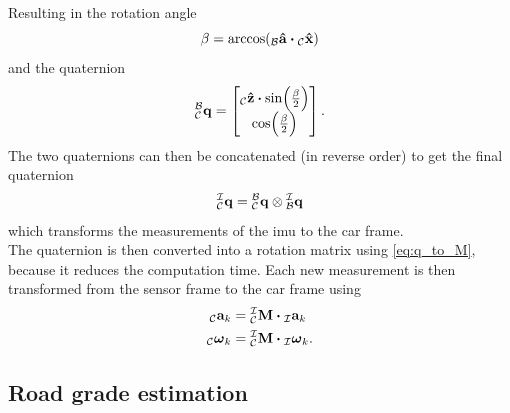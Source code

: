 Resulting in the rotation angle
\begin{equation}
	\beta = \arccos(\vincs{\vu{a}}{b} \vdot \vincs{\hat{x}}{c})
\end{equation}
and the quaternion
\begin{equation}
	\qtf{b}{c} =
	\begin{bmatrix}
		\vincs{\hat{z}}{c}\vdot\sin(\frac{\beta}{2}) \\
		\cos(\frac{\beta}{2})
	\end{bmatrix}.
\end{equation}
The two quaternions can then be concatenated (in reverse order) to get the final quaternion
\begin{equation}
	\qtf{i}{c} = \qtf{b}{c} \otimes  \qtf{i}{b}
\end{equation}
which transforms the measurements of the \gls{imu} to the car frame.\\
The quaternion is then converted into a rotation matrix using \cref{eq:q_to_M}, because it reduces the computation time.
Each new measurement is then transformed from the sensor frame to the car frame using
\begin{align}
	{}_{\mathcal{C}}\mathbf{a}_k                   & = \mtf{i}{c} \vdot {}_{\mathcal{I}}\mathbf{a}_k                    \\
	{}_{\mathcal{C}}\mathbf{\boldsymbol{\omega}}_k & = \mtf{i}{c} \vdot {}_{\mathcal{I}}\mathbf{\boldsymbol{\omega}}_k.
\end{align}


\subsection{Road grade estimation}
\label{ssec:road_grade_estimation_imu}
